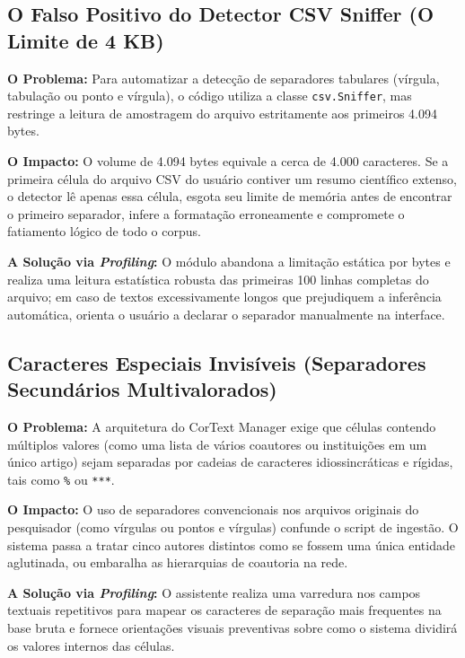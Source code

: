 \documentclass[
	oneside,
	a4paper,
	12pt,
	chapter=TITLE,
	section=TITLE,
	english,
	brazilian
]{abntex2}
\begin{document}
\begin{apendicesenv}
\FloatBarrier
\subsection{O Falso Positivo do Detector CSV Sniffer (O Limite de 4 KB)}\label{sec:o_falso_positivo_do_detector_csv_sniffer}


\textbf{O Problema:} Para automatizar a detecção de separadores tabulares (vírgula, tabulação ou ponto e vírgula), o código utiliza a classe \texttt{csv.\allowbreak Sniffer}, mas restringe a leitura de amostragem do arquivo estritamente aos primeiros 4.094 bytes.

\textbf{O Impacto:} O volume de 4.094 bytes equivale a cerca de 4.000 caracteres. Se a primeira célula do arquivo CSV do usuário contiver um resumo científico extenso, o detector lê apenas essa célula, esgota seu limite de memória antes de encontrar o primeiro separador, infere a formatação erroneamente e compromete o fatiamento lógico de todo o corpus.

\textbf{A Solução via \textit{Profiling}:} O módulo abandona a limitação estática por bytes e realiza uma leitura estatística robusta das primeiras 100 linhas completas do arquivo; em caso de textos excessivamente longos que prejudiquem a inferência automática, orienta o usuário a declarar o separador manualmente na interface.

\FloatBarrier
\subsection{Caracteres Especiais Invisíveis (Separadores Secundários Multivalorados)}\label{sec:caracteres_especiais_invisiveis_separado}


\textbf{O Problema:} A arquitetura do CorText Manager exige que células contendo múltiplos valores (como uma lista de vários coautores ou instituições em um único artigo) sejam separadas por cadeias de caracteres idiossincráticas e rígidas, tais como \texttt{\textbar{}\%\textbar{}} ou \texttt{***}.

\textbf{O Impacto:} O uso de separadores convencionais nos arquivos originais do pesquisador (como vírgulas ou pontos e vírgulas) confunde o script de ingestão. O sistema passa a tratar cinco autores distintos como se fossem uma única entidade aglutinada, ou embaralha as hierarquias de coautoria na rede.

\textbf{A Solução via \textit{Profiling}:} O assistente realiza uma varredura nos campos textuais repetitivos para mapear os caracteres de separação mais frequentes na base bruta e fornece orientações visuais preventivas sobre como o sistema dividirá os valores internos das células.


\end{apendicesenv}
\end{document}
